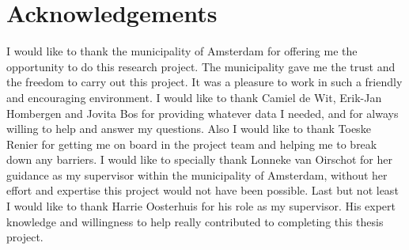 \documentclass[10pt, sigconf, format=acmsmall, screen=true, review=false]{acmart}
\begin{document}
\section*{Acknowledgements}
I would like to thank the municipality of Amsterdam for offering me the opportunity to do this research project. 
The municipality gave me the trust and the freedom to carry out this project.
It was a pleasure to work in such a friendly and encouraging environment.
I would like to thank Camiel de Wit, Erik-Jan Hombergen and Jovita Bos for providing whatever data I needed, and for always willing to help and answer my questions. 
Also I would like to thank Toeske Renier for getting me on board in the project team and helping me to break down any barriers. 
I would like to specially thank Lonneke van Oirschot for her guidance as my supervisor within the municipality of Amsterdam, without her effort and expertise this project would not have been possible. 
Last but not least I would like to thank Harrie Oosterhuis for his role as my supervisor. 
His expert knowledge and willingness to help really contributed to completing this thesis project.




\pagebreak
\onecolumn
\appendix



 
\end{document}
